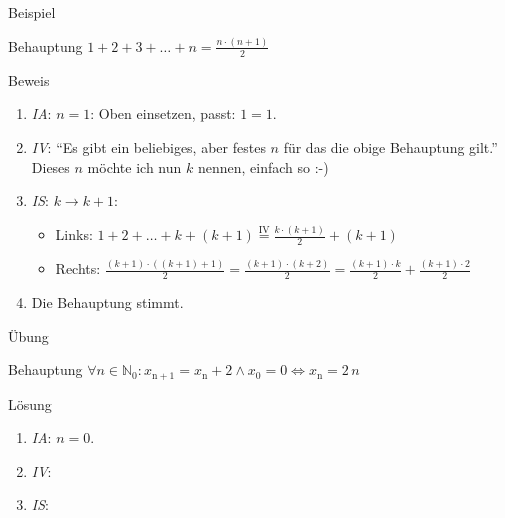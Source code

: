 \begin{frame}{Beispiel}
    \begin{block}{Behauptung}
        $ 1 + 2 + 3 + \dots + n = \frac{ n\cdot \left( n + 1\right) }{2}$\\
    \end{block}
    \pause
    \begin{block}{Beweis}
        \begin{enumerate}
            \item \emph{IA}: $n = 1$: Oben einsetzen, passt: $1 = 1$.
                \pause
            \item \emph{IV}: "`Es gibt ein beliebiges, aber festes $n$ für das die obige Behauptung gilt."' Dieses $n$ möchte ich nun $k$ nennen, einfach so :-)
                \pause
            \item \emph{IS}: $k \rightarrow k + 1$: 
                \begin{itemize}
                    \item Links: $ 1 + 2 + \dots + k + \left( k+1\right) \overset{\text{IV}}{=} \frac{k\cdot \left( k + 1\right)}{2} + \left( k + 1\right)$
                    \item Rechts: $\frac{\left(k + 1\right) \cdot \left(\left( k + 1\right) + 1\right)}{2} = \frac{\left( k + 1\right) \cdot \left( k + 2\right)}{2} = \frac{\left( k + 1\right) \cdot k}{2}  + \frac{\left( k + 1\right)\cdot 2}{2}$
                \end{itemize}
                \pause
            \item Die Behauptung stimmt.
        \end{enumerate}
    \end{block}
\end{frame}

\begin{frame}{Übung}
    \begin{block}{Behauptung}
        $\forall n \in \mathbb{N}_0 : x_{\mathrm{n + 1}} = x_\mathrm{n} + 2 \wedge x_0 = 0 \Leftrightarrow x_\mathrm{n} = 2\, n$
    \end{block}
    \pause
    \begin{block}{Lösung}
        \begin{enumerate}
            \item \emph{IA}: $n = 0$. 
                \pause
            \item \emph{IV}: 
                \pause
            \item \emph{IS}:\\ 
        \end{enumerate}
    \end{block}
\end{frame}


